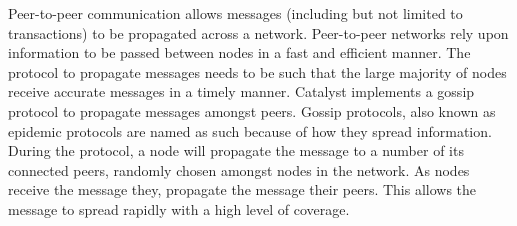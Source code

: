 Peer-to-peer communication allows messages (including but not limited to transactions) to be propagated across a network. Peer-to-peer networks rely upon information to be passed between nodes in a fast and efficient manner. The protocol to propagate messages needs to be such that the large majority of nodes receive accurate messages in a timely manner. Catalyst implements a gossip protocol to propagate messages amongst peers. Gossip protocols, also known as epidemic protocols are named as such because of how they spread information. During the protocol, a node will propagate the message to a number of its connected peers, randomly chosen amongst nodes in the network. As nodes receive the message they, propagate the message their peers. This allows the message to spread rapidly with a high level of coverage. 

